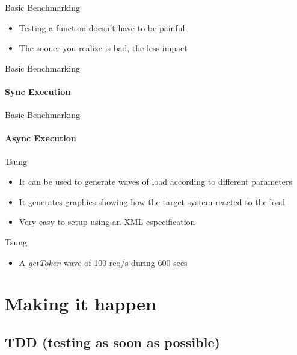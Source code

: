 \documentclass[aspectratio=169]{beamer}
\begin{document}
\begin{frame}{Basic Benchmarking}
    \begin{itemize}
    \item Testing a function doesn't have to be painful
    \item The sooner you realize is bad, the less impact
    \pause
        
    \end{itemize}
\end{frame}

\begin{frame}{Basic Benchmarking}
    \framesubtitle{Sync Execution}
    
\end{frame}

\begin{frame}{Basic Benchmarking}
    \framesubtitle{Async Execution}
    
\end{frame}

\begin{frame}{Tsung}
    \begin{itemize}
    \pause
    \item It can be used to generate waves of load according to different parameters
    \pause
    \item It generates graphics showing how the target system reacted to the load
    \pause
    \item Very easy to setup using an XML especification
    \end{itemize}
\end{frame}

\begin{frame}{Tsung}
    \begin{itemize}
    \item A \emph{getToken} wave of 100 req/s during 600 secs
    
    \end{itemize}
\end{frame}

\section*{Making it happen}
\label{making_it_happen}

\subsection*{TDD (testing as soon as possible)}
\label{tdd}
\end{document}
